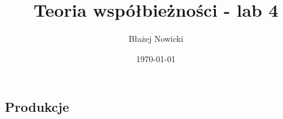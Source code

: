 \documentclass[12pt, letterpaper]{article}
\title{Teoria współbieżności - lab 4}
\author{Błażej Nowicki}
\date{\today}
\begin{document}
\maketitle
\subsection*{Produkcje}
\end{document}
